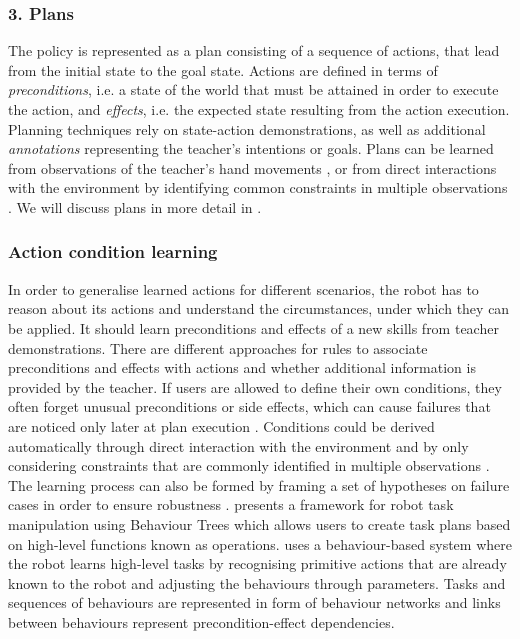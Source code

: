 \subsubsection{3. Plans}\label{sssec:Plans}
The policy is represented as a plan consisting of a sequence of actions, that lead from the initial state to the goal state.
Actions are defined in terms of \textit{preconditions}, i.e. a state of the world that must be attained in order to execute the action, and \textit{effects}, i.e. the expected state resulting from the action execution. 
Planning techniques rely on state-action demonstrations, as well as additional \textit{annotations} representing the teacher's intentions or goals.
Plans can be learned from observations of the teacher's hand movements \cite{kuniyoshi1994learning}, or from direct interactions with the environment by identifying common constraints in multiple observations \cite{ekvall2008robot}.
We will discuss plans in more detail in .

\subsubsection{Action condition learning}\label{sssec:Action condition learning}
In order to generalise learned actions for different scenarios, the robot has to reason about its actions and understand the circumstances, under which they can be applied. 
It should learn preconditions and effects of a new skills from teacher demonstrations.
There are different approaches for rules to associate preconditions and effects with actions and whether additional information is provided by the teacher.
If users are allowed to define their own conditions, they often forget unusual preconditions or side effects, which can cause failures that are noticed only later at plan execution \cite{gil1994learning}.
Conditions could be derived automatically through direct interaction with the environment and by only considering constraints that are commonly identified in multiple observations \cite{ekvall2008robot}.
The learning process can also be formed by framing a set of hypotheses on failure cases in order to ensure robustness \cite{yildiz2013learning}.
\cite{guerin2015framework} presents a framework for robot task manipulation using Behaviour Trees which allows users to create task plans based on high-level functions known as operations.
\cite{nicolescu2003natural} uses a behaviour-based system where the robot learns high-level tasks by recognising primitive actions that are already known to the robot and adjusting the behaviours through parameters.
Tasks and sequences of behaviours are represented in form of behaviour networks and links between behaviours represent precondition-effect dependencies.

